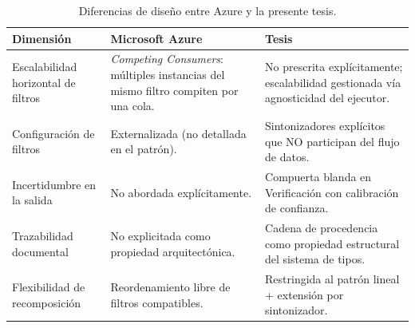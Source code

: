 \begin{table}[H]
  \centering
  \caption{Diferencias de diseño entre Azure y la presente tesis.}
  \label{tab:comparacion-azure-diferencias}
  \footnotesize
  \setlength{\tabcolsep}{4pt}
  \begin{tabularx}{\textwidth}{@{}l X X@{}}
    \toprule
    \textbf{Dimensión} & \textbf{Microsoft Azure} & \textbf{Tesis} \\
    \midrule
    Escalabilidad horizontal de filtros
      & \textit{Competing Consumers}: múltiples instancias del mismo filtro
        compiten por una cola.
      & No prescrita explícitamente; escalabilidad gestionada vía
        agnosticidad del ejecutor. \\
    \addlinespace
    Configuración de filtros
      & Externalizada (no detallada en el patrón).
      & Sintonizadores explícitos que NO participan del flujo de datos. \\
    \addlinespace
    Incertidumbre en la salida
      & No abordada explícitamente.
      & Compuerta blanda en Verificación con calibración de confianza. \\
    \addlinespace
    Trazabilidad documental
      & No explicitada como propiedad arquitectónica.
      & Cadena de procedencia como propiedad estructural del sistema de tipos. \\
    \addlinespace
    Flexibilidad de recomposición
      & Reordenamiento libre de filtros compatibles.
      & Restringida al patrón lineal + extensión por sintonizador. \\
    \bottomrule
  \end{tabularx}
\end{table}
